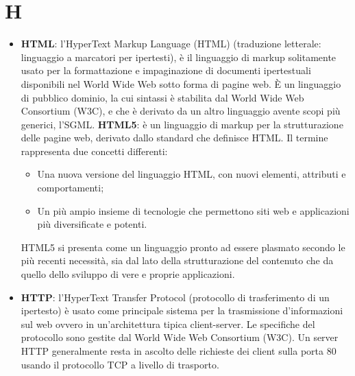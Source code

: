 \section{H}
\begin{itemize} 
	\item
	\textbf{HTML}: l'HyperText Markup Language (HTML) (traduzione letterale: linguaggio a marcatori per ipertesti), è il linguaggio di markup solitamente usato per la formattazione e impaginazione di documenti ipertestuali disponibili nel World Wide Web sotto forma di pagine web.
	È un linguaggio di pubblico dominio, la cui sintassi è stabilita dal World Wide Web Consortium (W3C), e che è derivato da un altro linguaggio avente scopi più generici, l'SGML. 
	\textbf{HTML5}: è un linguaggio di markup per la strutturazione delle pagine web, derivato dallo standard che definisce HTML.
	Il termine rappresenta due concetti differenti:
	\begin{itemize}
		\item
		Una nuova versione del linguaggio HTML, con nuovi elementi, attributi e comportamenti;
		\item
		Un più ampio insieme di tecnologie che permettono siti web e applicazioni più diversificate e potenti.
	\end{itemize}
	HTML5 si presenta come un linguaggio pronto ad essere plasmato secondo le più recenti necessità, sia dal lato della strutturazione del contenuto che da quello dello sviluppo di vere e proprie applicazioni.
	\item
	\textbf{HTTP}: l'HyperText Transfer Protocol (protocollo di trasferimento di un ipertesto) è usato come principale sistema per la trasmissione d'informazioni sul web ovvero in un'architettura tipica client-server. Le specifiche del protocollo sono gestite dal World Wide Web Consortium (W3C). Un server HTTP generalmente resta in ascolto delle richieste dei client sulla porta 80 usando il protocollo TCP a livello di trasporto.
\end{itemize}
